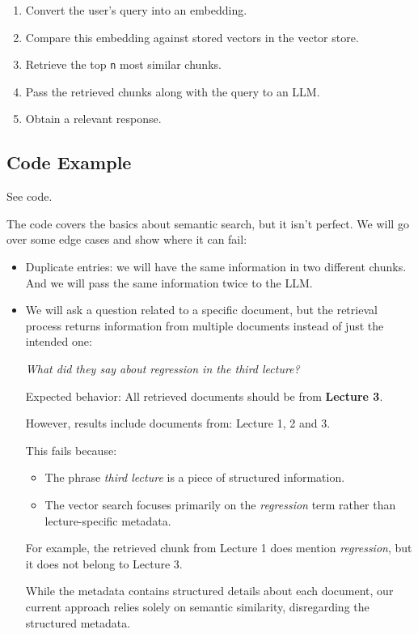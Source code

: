 \documentclass{article}
\begin{document}
\begin{enumerate}
    \item Convert the user’s query into an embedding.
    \item Compare this embedding against stored vectors in the vector store.
    \item Retrieve the top \texttt{n} most similar chunks.
    \item Pass the retrieved chunks along with the query to an LLM.
    \item Obtain a relevant response.
\end{enumerate}

\subsection{Code Example}

See code.

The code covers the basics about semantic search, but it isn't perfect. We will go over some edge cases and show where it can fail:

\begin{itemize}
    \item Duplicate entries: we will have the same information in two different chunks. And we will pass the same information twice to the LLM.
    \item We will ask a question related to a specific document, but the retrieval process returns information from multiple documents instead of just the intended one:

\begin{tcolorbox}[colback=gray!10, colframe=white, width=\textwidth, sharp corners=south]
\begin{center}
\textit{What did they say about regression in the third lecture?}
\end{center}
Expected behavior: All retrieved documents should be from \textbf{Lecture 3}. 

However, results include documents from: Lecture 1, 2 and 3.

This fails because:

\begin{itemize}
    \item The phrase \textit{third lecture} is a piece of structured information.
    \item The vector search focuses primarily on the \textit{regression} term rather than lecture-specific metadata.
\end{itemize}

For example, the retrieved chunk from Lecture 1 does mention \textit{regression}, but it does not belong to Lecture 3.
\end{tcolorbox}

While the metadata contains structured details about each document, our current approach relies solely on semantic similarity, disregarding the structured metadata.
\end{itemize}
\end{document}
